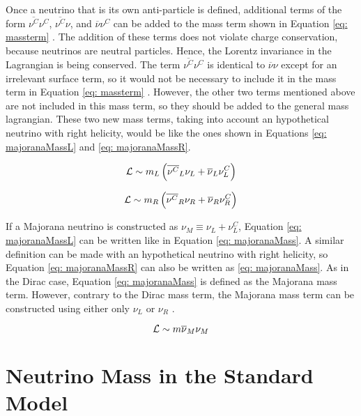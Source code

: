 Once a neutrino that is its own anti-particle is defined, additional terms of the form $\overline{\nu^{C}}\nu^{C}$, $\overline{\nu^{C}}\nu$, and $\overline{\nu}\nu^{C}$ can be added to the mass term shown in Equation \ref{eq: massterm} \cite{NeutrinoMass}. The addition of these terms does not violate charge conservation, because neutrinos are neutral particles. Hence, the Lorentz invariance in the Lagrangian is being conserved. The term $\overline{\nu^{C}}\nu^{C}$ is identical to $\overline{\nu}\nu$ except for an irrelevant surface term, so it would not be necessary to include it in the mass term in Equation \ref{eq: massterm} \cite{NeutrinoMass}. However, the other two terms mentioned above are not included in this mass term, so they should be added to the general mass lagrangian. These two new mass terms, taking into account an hypothetical neutrino with right helicity, would be like the ones shown in Equations \ref{eq: majoranaMassL} and \ref{eq: majoranaMassR}.

\begin{equation}\label{eq: majoranaMassL}
\mathcal{L} \sim m_{L}\left(\overline{\nu^{C}}_{L}\nu_{L}  + \overline{\nu}_{L}\nu^{C}_{L}\right)
\end{equation}

\begin{equation}\label{eq: majoranaMassR}
\mathcal{L} \sim m_{R}\left(\overline{\nu^{C}}_{R}\nu_{R}  + \overline{\nu}_{R}\nu^{C}_{R}\right) 
\end{equation}

If a Majorana neutrino is constructed as $\nu_{M} \equiv \nu_{L} + \nu_{L}^{C}$, Equation \ref{eq: majoranaMassL} can be written like in Equation \ref{eq: majoranaMass}. A similar definition can be made with an hypothetical neutrino with right helicity, so Equation \ref{eq: majoranaMassR} can also be written as \ref{eq: majoranaMass}. As in the Dirac case, Equation \ref{eq: majoranaMass} is defined as the Majorana mass term. However, contrary to the Dirac mass term, the Majorana mass term can be constructed using either only $\nu_{L}$ or $\nu_{R}$ \cite{NeutrinoMass}. 

\begin{equation}\label{eq: majoranaMass}
\mathcal{L} \sim m\overline{\nu}_{M}\nu_{M}
\end{equation}


\section{Neutrino Mass in the Standard Model}

